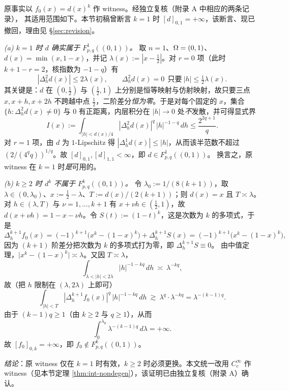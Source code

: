 \begin{remark}[原 witness $d^k$ 的适用范围：$k=1$ 可用，$k\ge2$ 失效]\label{rem:int-counter}
原事实以 $f_0(x)=d(x)^k$ 作 witness。经独立复核（附录 A 中相应的两条记录），
其适用范围如下。本节初稿曾断言 $k=1$ 时 $[d]_{0,1}=+\infty$，该断言、现已撤回，理由见 \S\ref{sec:revision}。

\emph{(a) $k=1$ 时 $d$ 确实属于 $F^1_{p,q}((0,1))$。}
取 $n=1$、$\Omega=(0,1)$、$d(x)=\min(x,1-x)$，并记 $\lambda(x):=|x-\tfrac12|$。对 $r=0$ 项（此时 $k+1-r=2$，核指数为 $-1-q$）有
\[
  |\Delta_h^2d(x)|\le 2\lambda(x),\qquad
  \Delta_h^2d(x)=0\ \ \text{只要}\ |h|\le\tfrac12\lambda(x).
\]
其关键是：$d$ 在 $(0,\tfrac12)$ 与 $(\tfrac12,1)$ 上分别是恒等映射与仿射映射，故只要三点 $x,x+h,x+2h$ 不跨越中点 $\tfrac12$，二阶差分\emph{恒为零}。于是对每个固定的 $x$，集合 $\{h:\Delta_h^2d(x)\ne0\}$ 与 $0$ 有正距离，内层积分在 $|h|\to0$ 处\emph{不}发散，并可得显式界
\[
  I(x):=\int_{|h|<d(x)/4}|\Delta_h^2d(x)|^q\,|h|^{-1-q}\,dh\le\frac{2^{2q+1}}{q}.
\]
对 $r=1$ 项，由 $d$ 为 $1$-Lipschitz 得 $|\Delta_h^1d(x)|\le|h|$，从而该半范数不超过 $(2/(4^qq))^{1/q}$。故 $[d]_{0,1},[d]_{1,1}<\infty$，即 $d\in F^1_{p,q}((0,1))$。
换言之，原 witness 在 $k=1$ 时\emph{是}可用的。

\emph{(b) $k\ge2$ 时 $d^k$ 不属于 $F^k_{p,q}((0,1))$。}
令 $\lambda_0:=1/(8(k+1))$，取 $\lambda\in(0,\lambda_0)$、$x:=\tfrac12-\lambda$、$T:=d(x)/(2(k+1))$；则 $d(x)=x$ 且 $T\asymp\lambda$。
对 $h\in(\lambda,T)$ 与 $\nu=1,\dots,k+1$ 有 $x+\nu h\in(\tfrac12,1)$，故 $d(x+\nu h)=1-x-\nu h$。令 $S(t):=(1-t)^k$，这是次数为 $k$ 的多项式，于是
\[
  \Delta_h^{k+1}f_0(x)
  =(-1)^{k+1}\big(x^k-(1-x)^k\big)+\Delta_h^{k+1}S(x)
  =(-1)^{k+1}\big(x^k-(1-x)^k\big),
\]
因为 $(k+1)$ 阶差分把次数为 $k$ 的多项式打为零，即 $\Delta_h^{k+1}S\equiv0$。
由中值定理，$\big|x^k-(1-x)^k\big|\asymp\lambda$。又因 $T\asymp\lambda$，
\[
  \int_{\lambda<|h|<2\lambda}|h|^{-1-kq}\,dh\ \asymp\ \lambda^{-kq},
\]
故（把 $h$ 限制在 $(\lambda,2\lambda)$ 上即可）
\[
  \int_{|h|<T}|\Delta_h^{k+1}f_0(x)|^q\,|h|^{-1-kq}\,dh
  \ \gtrsim\ \lambda^{q}\cdot\lambda^{-kq}
  =\lambda^{-(k-1)q}.
\]
由于 $(k-1)q\ge1$（由 $k\ge2$ 与 $q\ge1$），从而
\[
  \int_0^{\lambda_0}\lambda^{-(k-1)q}\,d\lambda=+\infty .
\]
故 $[f_0]_{0,k}=+\infty$，即 $f_0\notin F^k_{p,q}((0,1))$。

\emph{结论}：原 witness 仅在 $k=1$ 时有效，$k\ge2$ 时必须更换。本文统一改用 $C_c^\infty$ 作 witness（见本节定理 \ref{thm:int-nondegen}），该证明已由独立复核（附录 A）确认。
\end{remark}

